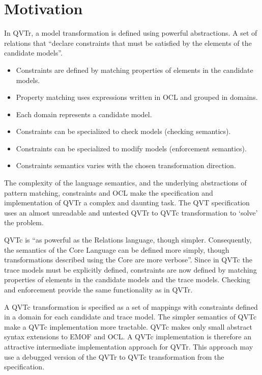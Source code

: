 %
\section{Motivation}\label{sec:motivation}
In QVTr, a model transformation is defined using powerful abstractions. A set of relations that \textquotedblleft declare constraints that must be satisfied by the elements of the candidate models\textquotedblright\cite{QVT1.1}.

\begin{itemize}
\item Constraints are defined by matching properties of elements in the candidate models.
\item Property matching uses expressions written in OCL and grouped in domains.
\item Each domain represents a candidate model.
\item Constraints can be specialized to check models (checking semantics).
\item Constraints can be specialized to modify models (enforcement semantics).
\item Constraints semantics varies with the chosen transformation direction.
\end{itemize}

The complexity of the language semantics, and the underlying abstractions of pattern matching, constraints and OCL make the specification and implementation of QVTr a complex and daunting task. The QVT specification uses an almost unreadable and untested QVTr to QVTc transformation to `solve' the problem.

QVTc is \textquotedblleft as powerful as the Relations language, though simpler. Consequently, the semantics of the Core Language can be defined more simply, though transformations described using the Core are more verbose\textquotedblright \cite{QVT1.1}. Since in QVTc the trace models must be explicitly defined, constraints are now defined by matching properties of elements in the candidate models and the trace models. Checking and enforcement provide the same functionality as in QVTr.

A QVTc transformation is specified as a set of mappings with constraints defined in a domain for each candidate and trace model. The simpler semantics of QVTc  make a QVTc implementation more tractable. QVTc makes only small abstract syntax extensions to EMOF and OCL. A QVTc implementation is therefore an attractive intermediate implementation approach for QVTr. This approach may use a debugged version of the QVTr to QVTc transformation from the specification.

